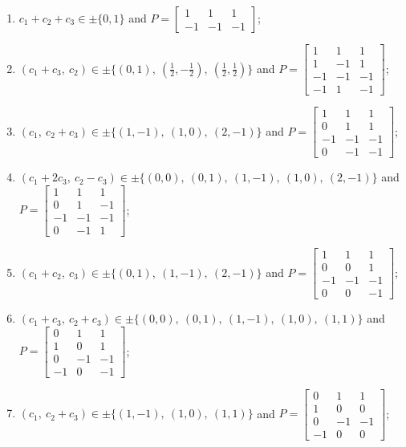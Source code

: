 
\begin{enumerate}
\item[(d1)] $c_1+c_2+c_3\in \pm\{0,1\}$ and $P=\begin{bmatrix}1&1&1\\-1&-1&-1\end{bmatrix}$;
\item[(d2)] $(c_1+c_3,\ c_2)\in \pm\{(0,1),\allowbreak\ (\tfrac{1}{2},-\tfrac{1}{2}),\allowbreak\ (\tfrac{1}{2},\tfrac{1}{2})\}$ and $P=\begin{bmatrix}1&1&1\\1&-1&1\\-1&-1&-1\\-1&1&-1\end{bmatrix}$;
\item[(d3)] $(c_1,\ c_2+c_3)\in \pm\{(1,-1),\allowbreak\ (1,0),\allowbreak\ (2,-1)\}$ and $P=\begin{bmatrix}1&1&1\\0&1&1\\-1&-1&-1\\0&-1&-1\end{bmatrix}$;
\item[(d4)] $(c_1+2 c_3,\ c_2- c_3)\in \pm\{(0,0),\allowbreak\ (0,1),\allowbreak\ (1,-1),\allowbreak\ (1,0),\allowbreak\ (2,-1)\}$ and $P=\begin{bmatrix}1&1&1\\0&1&-1\\-1&-1&-1\\0&-1&1\end{bmatrix}$;
\item[(d5)] $(c_1+c_2,\ c_3)\in \pm\{(0,1),\allowbreak\ (1,-1),\allowbreak\ (2,-1)\}$ and $P=\begin{bmatrix}1&1&1\\0&0&1\\-1&-1&-1\\0&0&-1\end{bmatrix}$;
\item[(d6)] $(c_1+c_3,\ c_2+c_3)\in \pm\{(0,0),\allowbreak\ (0,1),\allowbreak\ (1,-1),\allowbreak\ (1,0),\allowbreak\ (1,1)\}$ and $P=\begin{bmatrix}0&1&1\\1&0&1\\0&-1&-1\\-1&0&-1\end{bmatrix}$;
\item[(d7)] $(c_1,\ c_2+c_3)\in \pm\{(1,-1),\allowbreak\ (1,0),\allowbreak\ (1,1)\}$ and $P=\begin{bmatrix}0&1&1\\1&0&0\\0&-1&-1\\-1&0&0\end{bmatrix}$;

\end{enumerate}
